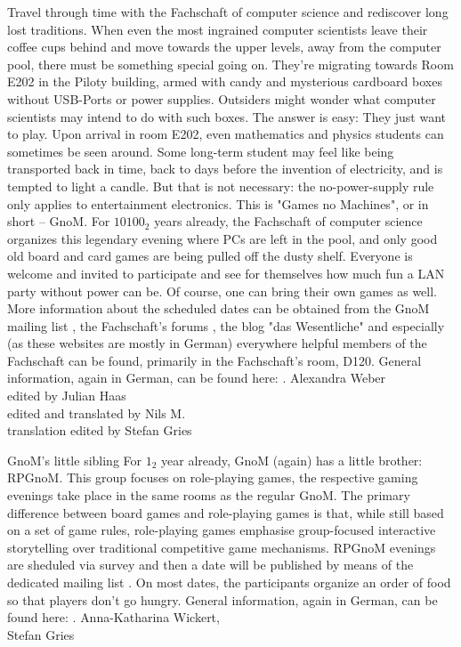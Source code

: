 {Travel through time with the Fachschaft of computer science and rediscover long lost traditions.
}{
When even the most ingrained computer scientists leave their coffee cups behind and move towards the upper levels, away from the computer pool, there must be something special going on.
They're migrating towards Room E202 in the Piloty building, armed with candy and mysterious cardboard boxes without USB-Ports or power supplies.
Outsiders might wonder what computer scientists may intend to do with such boxes. The answer is easy: They just want to play.
Upon arrival in room E202, even mathematics and physics students can sometimes be seen around.
Some long-term student may feel like being transported back in time, back to days before the invention of electricity, and is tempted to light a candle.
But that is not necessary: the no-power-supply rule only applies to entertainment electronics. This is "Games no Machines", or in short -- GnoM.
For $10100_2$ years already, the Fachschaft of computer science organizes this legendary evening where PCs are left in the pool, and only good old board and card games are being pulled off the dusty shelf.
Everyone is welcome and invited to participate and see for themselves how much fun a LAN party without power can be.
Of course, one can bring their own games as well.
More information about the scheduled dates can be obtained from the GnoM mailing list \footnotemark[1], the Fachschaft's forums \footnotemark[2], the blog "das Wesentliche" \footnotemark[3] and especially (as these websites are mostly in German) everywhere helpful members of the Fachschaft can be found, primarily in the Fachschaft's room, D120.
General information, again in German, can be found here: \footnotemark[4].
}
{
Alexandra Weber\\edited by Julian Haas\\edited and translated by Nils M.\\translation edited by Stefan Gries
}


{GnoM's little sibling}
{For $1_2$ year already, GnoM (again) has a little brother: RPGnoM.
This group focuses on role-playing games, the respective gaming evenings take place in the same rooms as the regular GnoM.
The primary difference between board games and role-playing games is that, while still based on a set of game rules, role-playing games emphasise group-focused interactive storytelling over traditional competitive game mechanisms.
RPGnoM evenings are sheduled via survey and then a date will be published by means of the dedicated mailing list \footnotemark[5].
On most dates, the participants organize an order of food so that players don't go hungry.
General information, again in German, can be found here: \footnotemark[6].
}
{
Anna-Katharina Wickert,\\Stefan Gries
}


